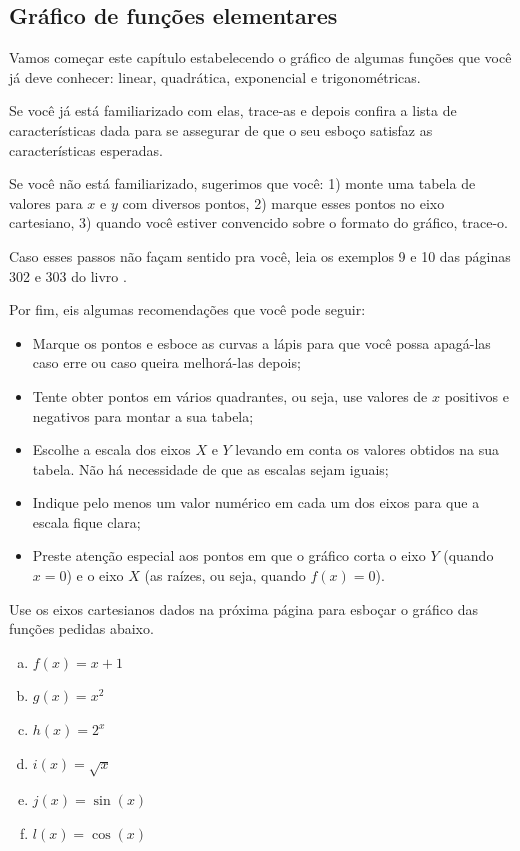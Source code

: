 \documentclass[main.tex]{subfiles}
\begin{document}
\subsection*{Gráfico de funções elementares}

Vamos começar este capítulo estabelecendo o gráfico de algumas funções que você já deve conhecer: linear, quadrática, exponencial e trigonométricas.

Se você já está familiarizado com elas, trace-as e depois confira a lista de características dada para se assegurar de que o seu esboço satisfaz as características esperadas.

Se você não está familiarizado, sugerimos que você: 1) monte uma tabela de valores para $x$ e $y$ com diversos pontos, 2) marque esses pontos no eixo cartesiano, 3) quando você estiver convencido sobre o formato do gráfico, trace-o.

Caso esses passos não façam sentido pra você, leia os exemplos 9 e 10 das páginas 302 e 303 do livro .

Por fim, eis algumas recomendações que você pode seguir:

\begin{itemize}
 \item Marque os pontos e esboce as curvas a lápis para que você possa apagá-las caso erre ou caso queira melhorá-las depois;
 \item Tente obter pontos em vários quadrantes, ou seja, use valores de $x$ positivos e negativos para montar a sua tabela;
 \item Escolhe a escala dos eixos $X$ e $Y$ levando em conta os valores obtidos na sua tabela. Não há necessidade de que as escalas sejam iguais;
 \item Indique pelo menos um valor numérico em cada um dos eixos para que a escala fique clara;
 \item Preste atenção especial aos pontos em que o gráfico corta o eixo $Y$ (quando $x=0$) e o eixo $X$ (as raízes, ou seja, quando $f(x)=0$).
\end{itemize}

\newpage

\begin{questao}
Use os eixos cartesianos dados na próxima página para esboçar o gráfico das funções pedidas abaixo.
\begin{enumerate}[a)]
\item $f(x)=x+1$
\item $g(x)=x^2$
\item $h(x)=2^x$
\item $i(x)=\sqrt{x}$
\item $j(x)=\sin(x)$
\item $l(x)=\cos(x)$
\end{enumerate}
\end{questao}
\end{document}
